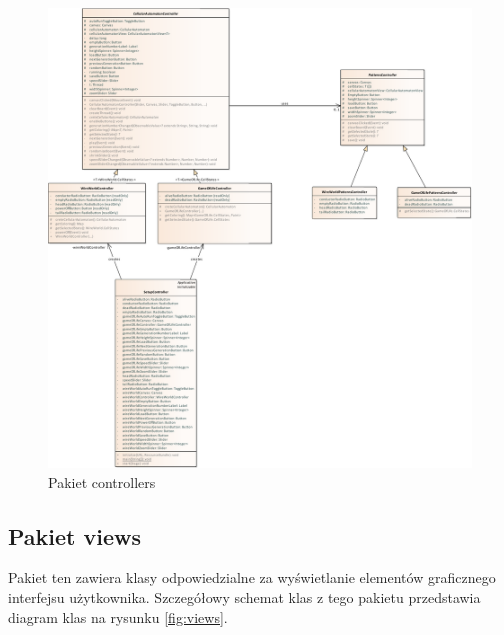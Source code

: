 \documentclass{report}
\begin{document}
\begin{figure}
	\centering
	\hspace*{-3cm}\includegraphics[width=17cm]{Pakiet_controllers}
	\caption{Pakiet controllers}
	\label{fig:coltrollers}
\end{figure}

\subsection{Pakiet views}
Pakiet ten zawiera klasy odpowiedzialne za wyświetlanie elementów graficznego interfejsu użytkownika.
Szczegółowy schemat klas z tego pakietu przedstawia diagram klas na rysunku \ref{fig:views}.
\end{document}
